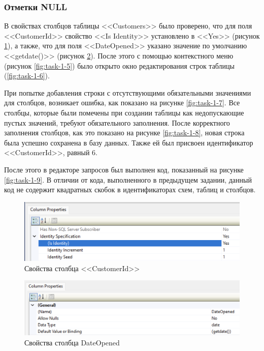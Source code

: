 \documentclass[a4paper, 14pt]{extarticle}
\begin{document}
\subsubsection{Отметки NULL}

В свойствах столбцов таблицы <<\foreignlanguage{english}{Customers}>> было
проверено, что для поля <<\foreignlanguage{english}{CustomerId}>> свойство
<<\foreignlanguage{english}{Is Identity}>> установлено в
<<\foreignlanguage{english}{Yes}>> (рисунок \ref{fig:task-1-3}), а также, что
для поля <<\foreignlanguage{english}{DateOpened}>> указано значение по умолчанию
<<\foreignlanguage{english}{getdate()}>> (рисунок \ref{fig:task-1-4}). После
этого с помощью контекстного меню (рисунок \ref{fig:task-1-5}) было открыто окно
редактирования строк таблицы (\ref{fig:task-1-6}).

При попытке добавления строки с отсутствующими обязательными значениями для
столбцов, возникает ошибка, как показано на рисунке \ref{fig:task-1-7}. Все
столбцы, которые были помечены при создании таблицы как недопускающие пустых
значений, требуют обязательного заполнения. После корректного заполнения
столбцов, как это показано на рисунке \ref{fig:task-1-8}, новая строка была
успешно сохранена в базу данных. Также ей был присвоен идентификатор
<<\foreignlanguage{english}{CustomerId}>>, равный 6.

После этого в редакторе запросов был выполнен код, показанный на рисунке
\ref{fig:task-1-9}. В отличии от кода, выполненного в предыдущем задании, данный
код не содержит квадратных скобок в идентификаторах схем, таблиц и столбцов.

\begin{figure}[H]
  \centering
  \includegraphics[width=\textwidth]{images/task-1/3.png}
  \caption{Свойства столбца <<\foreignlanguage{english}{CustomerId}>>}
  \label{fig:task-1-3}
\end{figure}

\begin{figure}[H]
  \centering
  \includegraphics[width=\textwidth]{images/task-1/4.png}
  \caption{Свойства столбца \foreignlanguage{english}{DateOpened}}
  \label{fig:task-1-4}
\end{figure}
\end{document}
